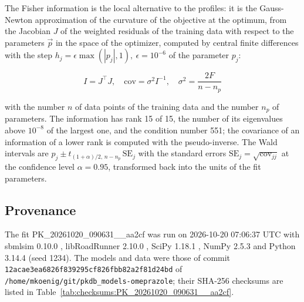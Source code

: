 \documentclass{article}
\begin{document}
The Fisher information is the local alternative to the profiles: it is the Gauss-Newton approximation of the curvature of the objective at the optimum, from the Jacobian $J$ of the weighted residuals of the training data with respect to the parameters $\vec{p}$ in the space of the optimizer, computed by central finite differences with the step $h_j = \epsilon \max(|p_j|, 1),\ \epsilon = 10^{-6}$ of the parameter $p_j$:

\begin{equation}
I = J^\top J, \quad \mathrm{cov} = \sigma^2 I^{-1}, \quad \sigma^2 = \frac{2 F}{n - n_p}
\end{equation}

with the number $n$ of data points of the training data and the number $n_p$ of parameters. The information has rank 15 of 15, the number of its eigenvalues above $10^{-8}$ of the largest one, and the condition number 551; the covariance of an information of a lower rank is computed with the pseudo-inverse. The Wald intervals are $\hat{p}_j \pm t_{(1+\alpha)/2,\, n-n_p}\, \mathrm{SE}_j$ with the standard errors $\mathrm{SE}_j = \sqrt{\mathrm{cov}_{jj}}$ at the confidence level $\alpha = 0.95$, transformed back into the units of the fit parameters.

\subsection{Provenance}

The fit PK\_20261020\_090631\_\_aa2cf was run on 2026-10-20 07:06:37 UTC with sbmlsim 0.10.0 \cite{Koenig2026_sbmlsim}, libRoadRunner 2.10.0 \cite{Welsh2023}, SciPy 1.18.1 \cite{Virtanen2020}, NumPy 2.5.3 \cite{Harris2020} and Python 3.14.4 (seed 1234). The models and data were those of commit \texttt{12acae3ea6826f839295cf826fbb82a2f81d24bd} of \texttt{/home/mkoenig/git/pkdb\_models-omeprazole}; their SHA-256 checksums are listed in Table~\ref{tab:checksums:PK_20261020_090631__aa2cf}.
\end{document}
